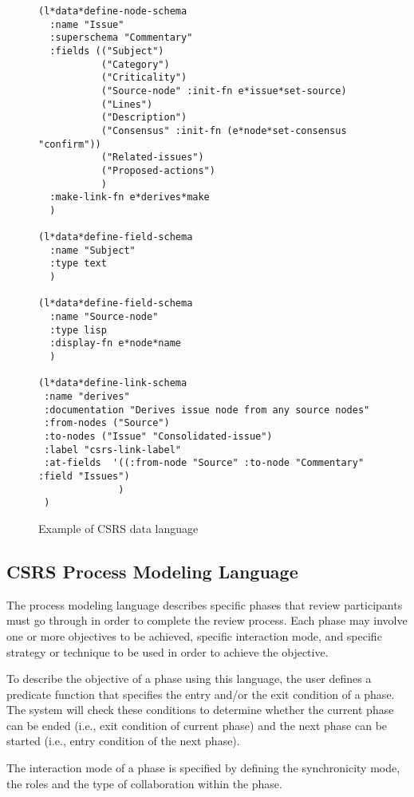 \begin{figure}[tp]
  \footnotesize
  \begin{verbatim}
(l*data*define-node-schema
  :name "Issue"
  :superschema "Commentary"
  :fields (("Subject")
           ("Category")
           ("Criticality")
           ("Source-node" :init-fn e*issue*set-source)
           ("Lines")
           ("Description")
           ("Consensus" :init-fn (e*node*set-consensus "confirm"))
           ("Related-issues")
           ("Proposed-actions")
           )
  :make-link-fn e*derives*make
  )

(l*data*define-field-schema
  :name "Subject"
  :type text
  )

(l*data*define-field-schema
  :name "Source-node"
  :type lisp
  :display-fn e*node*name
  )

(l*data*define-link-schema
 :name "derives"
 :documentation "Derives issue node from any source nodes"
 :from-nodes ("Source")
 :to-nodes ("Issue" "Consolidated-issue")
 :label "csrs-link-label"
 :at-fields  '((:from-node "Source" :to-node "Commentary" :field "Issues")
              )
 )

  \end{verbatim}
  \normalsize
  \caption{Example of CSRS data language}
  \label{fig:data-language}
\end{figure}



\subsection{CSRS Process Modeling Language}

The process modeling language describes specific phases that
review participants must go through in order to complete the review
process. 
Each phase  may involve one or more objectives to be
achieved, specific interaction mode, and specific strategy or
technique to be used in order to achieve the objective. 

To describe the objective of a phase using this language, the user
defines a predicate function that specifies the entry and/or the exit
condition of a phase. The system will check these conditions to
determine whether the current phase can be ended (i.e., exit
condition of current phase) and the next phase can be started (i.e.,
entry condition of the next phase). 

The interaction mode of a phase is specified by defining the
synchronicity mode, the roles and the type of collaboration within the
phase. 

